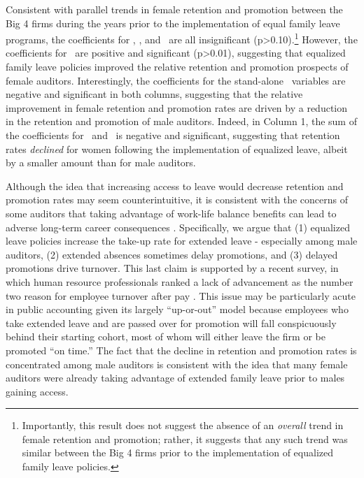 \documentclass[11pt]{article}
\begin{document}
            Consistent with parallel trends in female retention and promotion between the Big 4 firms during the years prior to the implementation of equal family leave programs, the coefficients for \FEMALExPREEQTHREE, \FEMALExPREEQTWO, and \FEMALExPREEQONE\ are all insignificant (p>0.10).\footnote{Importantly, this result does not suggest the absence of an \textit{overall} trend in female retention and promotion; rather, it suggests that any such trend was similar between the Big 4 firms prior to the implementation of equalized family leave policies.} However, the coefficients for \FEMALExPOSTEQ\ are positive and significant (p>0.01), suggesting that equalized family leave policies improved the relative retention and promotion prospects of female auditors. Interestingly, the coefficients for the stand-alone \POSTEQ\ variables are negative and significant in both columns, suggesting that the relative improvement in female retention and promotion rates are driven by a reduction in the retention and promotion of male auditors. Indeed, in Column 1, the sum of the coefficients for \POSTEQ\ and \FEMALExPOSTEQ\ is negative and significant, suggesting that retention rates \textit{declined} for women following the implementation of equalized leave, albeit by a smaller amount than for male auditors.
            
            Although the idea that increasing access to leave would decrease retention and promotion rates may seem counterintuitive, it is consistent with the concerns of some auditors that taking advantage of work-life balance benefits can lead to adverse long-term career consequences \parencite{buchheitContemporaryAnalysisAccounting2016}. Specifically, we argue that (1) equalized leave policies increase the take-up rate for extended leave - especially among male auditors, (2) extended absences sometimes delay promotions, and (3) delayed promotions drive turnover. This last claim is supported by a recent survey, in which human resource professionals ranked a lack of advancement as the number two reason for employee turnover after pay \parencite{goldenSHRMLackAdvancement2022}. This issue may be particularly acute in public accounting given its largely ``up-or-out'' model because employees who take extended leave and are passed over for promotion will fall conspicuously behind their starting cohort, most of whom will either leave the firm or be promoted ``on time.'' The fact that the decline in retention and promotion rates is concentrated among male auditors is consistent with the idea that many female auditors were already taking advantage of extended family leave prior to males gaining access. 
            
\end{document}
